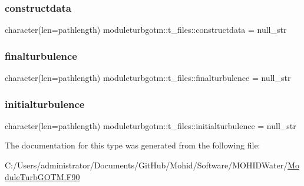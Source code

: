 \subsubsection{\texorpdfstring{constructdata}{constructdata}}
{\footnotesize\ttfamily character(len=pathlength) moduleturbgotm\+::t\+\_\+files\+::constructdata = null\+\_\+str\hspace{0.3cm}{\ttfamily [private]}}

\mbox{\label{structmoduleturbgotm_1_1t__files_a79bd86466f119993387428e407059bdc}} 
\subsubsection{\texorpdfstring{finalturbulence}{finalturbulence}}
{\footnotesize\ttfamily character(len=pathlength) moduleturbgotm\+::t\+\_\+files\+::finalturbulence = null\+\_\+str\hspace{0.3cm}{\ttfamily [private]}}

\mbox{\label{structmoduleturbgotm_1_1t__files_a1d6471cf8e421513b6162b58da7f5e47}} 
\subsubsection{\texorpdfstring{initialturbulence}{initialturbulence}}
{\footnotesize\ttfamily character(len=pathlength) moduleturbgotm\+::t\+\_\+files\+::initialturbulence = null\+\_\+str\hspace{0.3cm}{\ttfamily [private]}}



The documentation for this type was generated from the following file\+:\begin{DoxyCompactItemize}
\item 
C\+:/\+Users/administrator/\+Documents/\+Git\+Hub/\+Mohid/\+Software/\+M\+O\+H\+I\+D\+Water/\mbox{\hyperlink{_module_turb_g_o_t_m_8_f90}{Module\+Turb\+G\+O\+T\+M.\+F90}}\end{DoxyCompactItemize}
